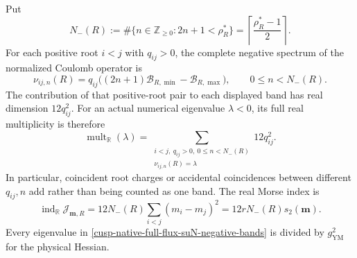 \begin{theorem}
\label{cusp-native-full-flux-suN-Morse-theorem}
Put
\begin{equation}
 N_-(R):=\#\{n\in\mathbb Z_{\ge0}:2n+1<\rho_R^*\}
 =\left\lceil\frac{\rho_R^*-1}{2}\right\rceil.
 \label{cusp-native-full-flux-suN-N-minus}
\end{equation}
For each positive root \(i<j\) with \(q_{ij}>0\), the complete negative
spectrum of the normalized Coulomb operator is
\begin{equation}
 \nu_{ij,n}(R)
 =q_{ij}\bigl((2n+1)\mathcal B_{R,\min}
                  -\mathcal B_{R,\max}\bigr),
 \qquad 0\le n<N_-(R).
 \label{cusp-native-full-flux-suN-negative-bands}
\end{equation}
The contribution of that positive-root pair to each displayed band has real
dimension \(12q_{ij}^2\).  For an actual numerical eigenvalue
\(\lambda<0\), its full real multiplicity is therefore
\begin{equation}
 \operatorname{mult}_{\mathbb R}(\lambda)
 =\sum_{\substack{i<j,\ q_{ij}>0,\ 0\le n<N_-(R)\\
                   \nu_{ij,n}(R)=\lambda}}
   12q_{ij}^2.
 \label{cusp-native-full-flux-suN-coincident-multiplicity}
\end{equation}
In particular, coincident root charges or accidental coincidences between
different \(q_{ij},n\) add rather than being counted as one band.  The real
Morse index is
\begin{equation}
 \boxed{
 \operatorname{ind}_{\mathbb R}\mathcal J_{\mathbf m,R}
 =12N_-(R)\sum_{i<j}(m_i-m_j)^2
 =12rN_-(R)s_2(\mathbf m).}
 \label{cusp-native-full-flux-suN-index}
\end{equation}
Every eigenvalue in
\cref{cusp-native-full-flux-suN-negative-bands} is divided by
\(g_{\mathrm{YM}}^2\) for the physical Hessian.
\end{theorem}


